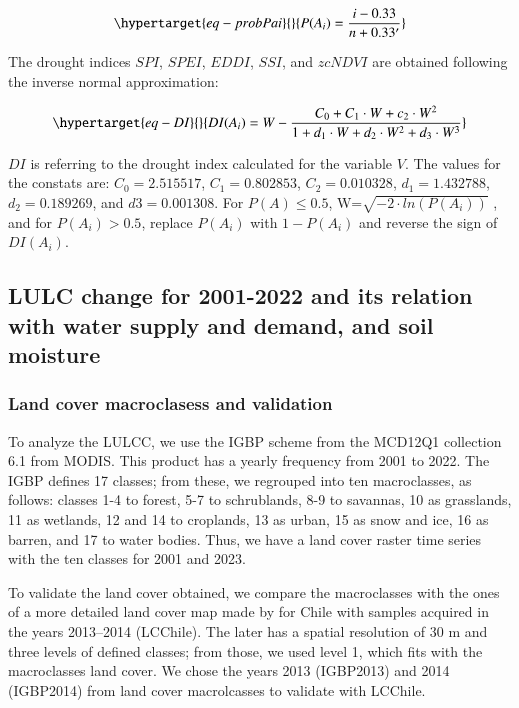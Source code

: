 \documentclass[
  authoryear,
  preprint,
  3p,
  onecolumn]{elsarticle}
\begin{document}
\begin{equation}\protect\hypertarget{eq-probPai}{}{P(A_i) = \frac{i-0.33}{n+0.33'}}\label{eq-probPai}\end{equation}

The drought indices \(SPI\), \(SPEI\), \(EDDI\), \(SSI\), and \(zcNDVI\)
are obtained following the inverse normal approximation:

\begin{equation}\protect\hypertarget{eq-DI}{}{DI(A_i) = W - \frac{C_0+C_1\cdot W + c_2 \cdot W^2}{1+d_1\cdot W +d_2\cdot W^2 +d_3\cdot W^3}}\label{eq-DI}\end{equation}

\(DI\) is referring to the drought index calculated for the variable
\(V\). The values for the constats are: \(C_0 = 2.515517\),
\(C_1 = 0.802853\), \(C_2 = 0.010328\), \(d_1 = 1.432788\),
\(d_2 = 0.189269\), and \(d3 = 0.001308\). For \(P(A) \leq 0.5\),
W=\(\sqrt{-2\cdot ln(P(A_i))}\) , and for \(P(A_i) > 0.5\), replace
\(P(A_i)\) with \(1-P(A_i)\) and reverse the sign of \(DI(A_i)\).

\hypertarget{sec-methods_lulc}{%
\subsection{LULC change for 2001-2022 and its relation with water supply
and demand, and soil moisture}\label{sec-methods_lulc}}

\hypertarget{land-cover-macroclasess-and-validation}{%
\subsubsection{Land cover macroclasess and
validation}\label{land-cover-macroclasess-and-validation}}

To analyze the LULCC, we use the IGBP scheme from the MCD12Q1 collection
6.1 from MODIS. This product has a yearly frequency from 2001 to 2022.
The IGBP defines 17 classes; from these, we regrouped into ten
macroclasses, as follows: classes 1-4 to forest, 5-7 to schrublands, 8-9
to savannas, 10 as grasslands, 11 as wetlands, 12 and 14 to croplands,
13 as urban, 15 as snow and ice, 16 as barren, and 17 to water bodies.
Thus, we have a land cover raster time series with the ten classes for
2001 and 2023.

To validate the land cover obtained, we compare the macroclasses with
the ones of a more detailed land cover map made by \citet{Zhao2016} for
Chile with samples acquired in the years 2013--2014 (LCChile). The later
has a spatial resolution of 30 m and three levels of defined classes;
from those, we used level 1, which fits with the macroclasses land
cover. We chose the years 2013 (IGBP2013) and 2014 (IGBP2014) from land
cover macrolcasses to validate with LCChile.
\end{document}
